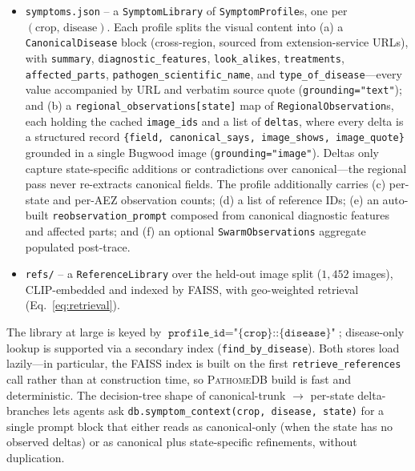 \documentclass[11pt,twocolumn]{article}
\newcommand{\pathomedb}{\textsc{PathomeDB}\xspace}
\begin{document}
\begin{itemize}
  \item \texttt{symptoms.json} -- a
    \texttt{SymptomLibrary} of
    \texttt{SymptomProfile}s, one per
    $(\text{crop},\,\text{disease})$.
    Each profile splits the visual content into
    (a) a \texttt{CanonicalDisease} block
    (cross-region, sourced from extension-service
    URLs), with \texttt{summary},
    \texttt{diagnostic\_features},
    \texttt{look\_alikes}, \texttt{treatments},
    \texttt{affected\_parts},
    \texttt{pathogen\_scientific\_name}, and
    \texttt{type\_of\_disease}---every value
    accompanied by URL and verbatim source quote
    (\texttt{grounding="text"}); and
    (b) a \texttt{regional\_observations[state]}
    map of \texttt{RegionalObservation}s, each
    holding the cached \texttt{image\_ids} and a
    list of \texttt{deltas}, where every delta is a
    structured record \texttt{\{field,
    canonical\_says, image\_shows, image\_quote\}}
    grounded in a single Bugwood image
    (\texttt{grounding="image"}). Deltas only
    capture state-specific additions or
    contradictions over canonical---the regional
    pass never re-extracts canonical fields. The
    profile additionally carries (c) per-state and
    per-AEZ observation counts;
    (d) a list of reference IDs;
    (e) an auto-built \texttt{reobservation\_prompt}
    composed from canonical diagnostic features and
    affected parts; and
    (f) an optional \texttt{SwarmObservations}
    aggregate populated post-trace.
  \item \texttt{refs/} -- a
    \texttt{ReferenceLibrary} over the held-out
    image split ($1{,}452$ images), CLIP-embedded
    and indexed by FAISS, with geo-weighted
    retrieval (Eq.~\ref{eq:retrieval}).
\end{itemize}

The library at large is keyed by
$\texttt{profile\_id}{=}\texttt{"\{crop\}::\{disease\}"}$;
disease-only lookup is supported via a secondary
index (\texttt{find\_by\_disease}). Both stores
load lazily---in particular, the FAISS index is
built on the first
\texttt{retrieve\_references} call rather than
at construction time, so \pathomedb build is fast
and deterministic. The decision-tree shape of
canonical-trunk $\to$ per-state delta-branches lets
agents ask \texttt{db.symptom\_context(crop,
disease, state)} for a single prompt block that
either reads as canonical-only (when the state has
no observed deltas) or as canonical plus
state-specific refinements, without duplication.
\end{document}
